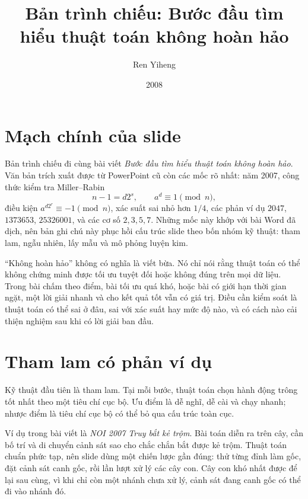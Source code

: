 \documentclass[11pt]{article}
\title{Bản trình chiếu: Bước đầu tìm hiểu thuật toán không hoàn hảo}
\author{Ren Yiheng}
\date{2008}
\begin{document}
\maketitle


\section{Mạch chính của slide}

Bản trình chiếu đi cùng bài viết \emph{Bước đầu tìm hiểu thuật toán không hoàn
hảo}. Văn bản trích xuất được từ PowerPoint cũ còn các mốc rõ nhất: năm
2007, công thức kiểm tra Miller--Rabin
\[
  n-1=d2^s,\qquad a^d\equiv 1\pmod n,
\]
điều kiện \(a^{d2^r}\equiv -1\pmod n\), xác suất sai nhỏ hơn \(1/4\), các
phản ví dụ \(2047\), \(1373653\), \(25326001\), và các cơ số \(2,3,5,7\).
Những mốc này khớp với bài Word đã dịch, nên bản ghi chú này phục hồi cấu
trúc slide theo bốn nhóm kỹ thuật: tham lam, ngẫu nhiên, lấy mẫu và mô phỏng
luyện kim.

``Không hoàn hảo'' không có nghĩa là viết bừa. Nó chỉ nói rằng thuật toán có
thể không chứng minh được tối ưu tuyệt đối hoặc không đúng trên mọi dữ liệu.
Trong bài chấm theo điểm, bài tối ưu quá khó, hoặc bài có giới hạn thời gian
ngặt, một lời giải nhanh và cho kết quả tốt vẫn có giá trị. Điều cần kiểm
soát là thuật toán có thể sai ở đâu, sai với xác suất hay mức độ nào, và có
cách nào cải thiện nghiệm sau khi có lời giải ban đầu.

\section{Tham lam có phản ví dụ}

Kỹ thuật đầu tiên là tham lam. Tại mỗi bước, thuật toán chọn hành động trông
tốt nhất theo một tiêu chí cục bộ. Ưu điểm là dễ nghĩ, dễ cài và chạy nhanh;
nhược điểm là tiêu chí cục bộ có thể bỏ qua cấu trúc toàn cục.

Ví dụ trong bài viết là \textit{NOI 2007 Truy bắt kẻ trộm}. Bài toán diễn ra
trên cây, cần bố trí và di chuyển cảnh sát sao cho chắc chắn bắt được kẻ
trộm. Thuật toán chuẩn phức tạp, nên slide dùng một chiến lược gần đúng: thử
từng đỉnh làm gốc, đặt cảnh sát canh gốc, rồi lần lượt xử lý các cây con. Cây
con khó nhất được để lại sau cùng, vì khi chỉ còn một nhánh chưa xử lý, cảnh
sát đang canh gốc có thể đi vào nhánh đó.
\end{document}
